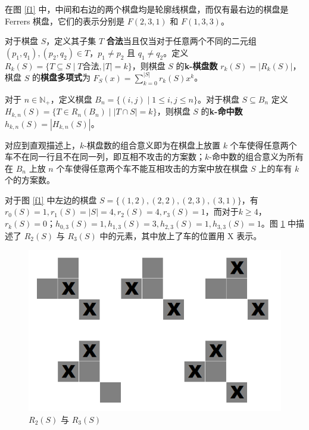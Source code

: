 \documentclass{noithesis}
\begin{document}
	在图 \ref{f1} 中，中间和右边的两个棋盘均是轮廓线棋盘，而仅有最右边的棋盘是 Ferrers 棋盘，它们的表示分别是 $F(2,3,1)$ 和 $F(1,3,3)$。
	
	\begin{definition}
		对于棋盘 $S$，定义其子集 $T$ \textbf{合法}当且仅当对于任意两个不同的二元组 $(p_1,q_1),(p_2,q_2) \in T$，$p_1 \neq p_2$ 且 $q_1 \neq q_2$。定义 $R_k(S) = \{T \subseteq S \mid T \text{合法} ,|T| = k\}$，则棋盘 $S$ 的\textbf{k-棋盘数} $r_k(S) = |R_k(S)|$，棋盘 $S$ 的\textbf{棋盘多项式}为 $F_S(x) = \sum_{k=0}^{|S|} r_k(S)x^k$。
	\end{definition}
	\begin{definition}
		对于 $n \in \mathbb{N_+}$，定义棋盘 $B_n = \{(i,j) \mid 1 \leq i,j \leq n\}$。对于棋盘 $S \subseteq B_n$ 定义 $H_{k,n}(S) = \{T \in R_n(B_n) \mid |T \cap S| = k \}$，则棋盘 $S$ 的\textbf{k-命中数} $h_{k,n}(S) = |H_{k,n}(S)|$。
	\end{definition}
	
	对应到直观描述上，$k$-棋盘数的组合意义即为在棋盘上放置 $k$ 个车使得任意两个车不在同一行且不在同一列，即互相不攻击的方案数；$k$-命中数的组合意义为所有在 $B_n$ 上放 $n$ 个车使得任意两个车不能互相攻击的方案中放在棋盘 $S$ 上的车有 $k$ 个的方案数。
	
	对于图 \ref{f1} 中左边的棋盘 $S = \{(1,2),(2,2),(2,3),(3,1)\}$，有 $r_0(S) = 1 , r_1(S) = |S| = 4 , r_2(S) = 4 , r_3(S) = 1$，而对于$k \geq 4$，$r_k(S) = 0$；$h_{0,3}(S) = 1 , h_{1,3}(S) = 3,h_{2,3}(S) = 1 , h_{3,3}(S) = 1$。图 \ref{f2} 中描述了 $R_2(S)$ 与 $R_3(S)$ 中的元素，其中放上了车的位置用 X 表示。
	
	\begin{figure}[h]
		\centering
		\caption{$R_2(S)$ 与 $R_3(S)$}
		\label{f2}
		\includegraphics[scale=0.4]{picture/figure2.png}
	\end{figure}
	
\end{document}
